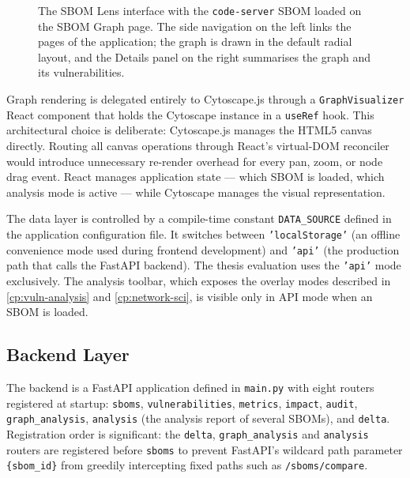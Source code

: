 \begin{figure}[!htpb]
    \centering
    \caption[The SBOM Lens interface]{The SBOM Lens interface with the \texttt{code-server} SBOM loaded on the SBOM Graph page. The side navigation on the left links the pages of the application; the graph is drawn in the default radial layout, and the Details panel on the right summarises the graph and its vulnerabilities.}
    \label{fig:app-overview}
\end{figure}

Graph rendering is delegated entirely to Cytoscape.js through a \texttt{GraphVisualizer} React component that holds the Cytoscape instance in a \texttt{useRef} hook. This architectural choice is deliberate: Cytoscape.js manages the HTML5 canvas directly. Routing all canvas operations through React's virtual-DOM reconciler would introduce unnecessary re-render overhead for every pan, zoom, or node drag event. React manages application state --- which SBOM is loaded, which analysis mode is active --- while Cytoscape manages the visual representation.

The data layer is controlled by a compile-time constant \texttt{DATA\_SOURCE} defined in the application configuration file. It switches between \texttt{'localStorage'} (an offline convenience mode used during frontend development) and \texttt{'api'} (the production path that calls the FastAPI backend). The thesis evaluation uses the \texttt{'api'} mode exclusively. The analysis toolbar, which exposes the overlay modes described in \autoref{cp:vuln-analysis} and \autoref{cp:network-sci}, is visible only in API mode when an SBOM is loaded.


\subsection{Backend Layer}
\label{sec:backend}

The backend is a FastAPI application defined in \texttt{main.py} with eight routers registered at startup: \texttt{sboms}, \texttt{vulnerabilities}, \texttt{metrics}, \texttt{impact}, \texttt{audit}, \texttt{graph\_analysis}, \texttt{analysis} (the analysis report of several SBOMs), and \texttt{delta}. Registration order is significant: the \texttt{delta}, \texttt{graph\_analysis} and \texttt{analysis} routers are registered before \texttt{sboms} to prevent FastAPI's wildcard path parameter \texttt{\{sbom\_id\}} from greedily intercepting fixed paths such as \texttt{/sboms/compare}.

